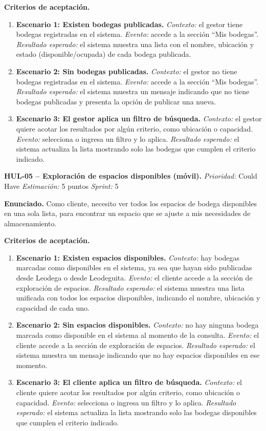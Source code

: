 \textbf{Criterios de aceptación.}
\begin{enumerate}
\item \textbf{Escenario 1: Existen bodegas publicadas.} \textit{Contexto:} el gestor tiene bodegas registradas en el sistema. \textit{Evento:} accede a la sección ``Mis bodegas''. \textit{Resultado esperado:} el sistema muestra una lista con el nombre, ubicación y estado (disponible/ocupada) de cada bodega publicada.
\item \textbf{Escenario 2: Sin bodegas publicadas.} \textit{Contexto:} el gestor no tiene bodegas registradas en el sistema. \textit{Evento:} accede a la sección ``Mis bodegas''. \textit{Resultado esperado:} el sistema muestra un mensaje indicando que no tiene bodegas publicadas y presenta la opción de publicar una nueva.
\item \textbf{Escenario 3: El gestor aplica un filtro de búsqueda.} \textit{Contexto:} el gestor quiere acotar los resultados por algún criterio, como ubicación o capacidad. \textit{Evento:} selecciona o ingresa un filtro y lo aplica. \textit{Resultado esperado:} el sistema actualiza la lista mostrando solo las bodegas que cumplen el criterio indicado.
\end{enumerate}

\textbf{HUL-05 -- Exploración de espacios disponibles (móvil).} \label{req:HUL-05}
\textit{Prioridad:} Could Have \quad \textit{Estimación:} 5 puntos \quad \textit{Sprint:} 5

\textbf{Enunciado.} Como cliente, necesito ver todos los espacios de bodega disponibles en una sola lista, para encontrar un espacio que se ajuste a mis necesidades de almacenamiento.

\textbf{Criterios de aceptación.}
\begin{enumerate}
\item \textbf{Escenario 1: Existen espacios disponibles.} \textit{Contexto:} hay bodegas marcadas como disponibles en el sistema, ya sea que hayan sido publicadas desde Leodega o desde Leodeguita. \textit{Evento:} el cliente accede a la sección de exploración de espacios. \textit{Resultado esperado:} el sistema muestra una lista unificada con todos los espacios disponibles, indicando el nombre, ubicación y capacidad de cada uno.
\item \textbf{Escenario 2: Sin espacios disponibles.} \textit{Contexto:} no hay ninguna bodega marcada como disponible en el sistema al momento de la consulta. \textit{Evento:} el cliente accede a la sección de exploración de espacios. \textit{Resultado esperado:} el sistema muestra un mensaje indicando que no hay espacios disponibles en ese momento.
\item \textbf{Escenario 3: El cliente aplica un filtro de búsqueda.} \textit{Contexto:} el cliente quiere acotar los resultados por algún criterio, como ubicación o capacidad. \textit{Evento:} selecciona o ingresa un filtro y lo aplica. \textit{Resultado esperado:} el sistema actualiza la lista mostrando solo las bodegas disponibles que cumplen el criterio indicado.
\end{enumerate}

